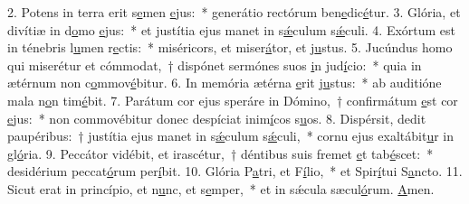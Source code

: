 2. Potens in terra erit s\uline{e}men \uline{e}jus:~* generátio rectórum ben\uline{e}dic\uline{é}tur.
3. Glória, et divítiæ in d\uline{o}mo \uline{e}jus:~* et justítia ejus manet in s\uline{ǽ}culum s\uline{ǽ}culi.
4. Exórtum est in ténebris l\uline{u}men r\uline{e}ctis:~* miséricors, et miser\uline{á}tor, et j\uline{u}stus.
5. Jucúndus homo qui miserétur et cómmodat,~† dispónet sermónes suos \uline{i}n jud\uline{í}cio:~* quia in ætérnum non c\uline{o}mmov\uline{é}bitur.
6. In memória ætérna \uline{e}rit j\uline{u}stus:~* ab auditióne mala n\uline{o}n tim\uline{é}bit.
7. Parátum cor ejus speráre in Dómino,~† confirmátum \uline{e}st cor \uline{e}jus:~* non commovébitur donec despíciat inim\uline{í}cos s\uline{u}os.
8. Dispérsit, dedit paupéribus:~† justítia ejus manet in s\uline{ǽ}culum s\uline{ǽ}culi,~* cornu ejus exaltábit\uline{u}r in gl\uline{ó}ria.
9. Peccátor vidébit, et irascétur,~† déntibus suis fremet \uline{e}t tab\uline{é}scet:~* desidérium peccat\uline{ó}rum per\uline{í}bit.
10. Glória P\uline{a}tri, et F\uline{í}lio,~* et Spir\uline{í}tui S\uline{a}ncto.
11. Sicut erat in princípio, et n\uline{u}nc, et s\uline{e}mper,~* et in sǽcula sæcul\uline{ó}rum. \uline{A}men.
